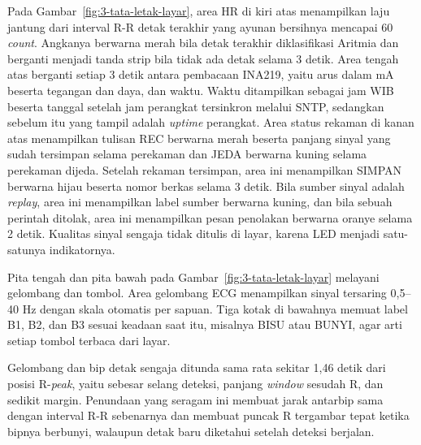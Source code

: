 Pada Gambar~\ref{fig:3-tata-letak-layar}, area HR di kiri atas menampilkan laju jantung dari interval R-R detak terakhir yang ayunan bersihnya mencapai 60 \textit{count}. Angkanya berwarna merah bila detak terakhir diklasifikasi Aritmia dan berganti menjadi tanda strip bila tidak ada detak selama 3 detik. Area tengah atas berganti setiap 3 detik antara pembacaan INA219, yaitu arus dalam mA beserta tegangan dan daya, dan waktu. Waktu ditampilkan sebagai jam WIB beserta tanggal setelah jam perangkat tersinkron melalui SNTP, sedangkan sebelum itu yang tampil adalah \textit{uptime} perangkat. Area status rekaman di kanan atas menampilkan tulisan REC berwarna merah beserta panjang sinyal yang sudah tersimpan selama perekaman dan JEDA berwarna kuning selama perekaman dijeda. Setelah rekaman tersimpan, area ini menampilkan SIMPAN berwarna hijau beserta nomor berkas selama 3 detik. Bila sumber sinyal adalah \textit{replay}, area ini menampilkan label sumber berwarna kuning, dan bila sebuah perintah ditolak, area ini menampilkan pesan penolakan berwarna oranye selama 2 detik. Kualitas sinyal sengaja tidak ditulis di layar, karena LED menjadi satu-satunya indikatornya.

Pita tengah dan pita bawah pada Gambar~\ref{fig:3-tata-letak-layar} melayani gelombang dan tombol. Area gelombang ECG menampilkan sinyal tersaring 0,5--40 Hz dengan skala otomatis per sapuan. Tiga kotak di bawahnya memuat label B1, B2, dan B3 sesuai keadaan saat itu, misalnya BISU atau BUNYI, agar arti setiap tombol terbaca dari layar.

Gelombang dan bip detak sengaja ditunda sama rata sekitar 1,46 detik dari posisi R-\textit{peak}, yaitu sebesar selang deteksi, panjang \textit{window} sesudah R, dan sedikit margin. Penundaan yang seragam ini membuat jarak antarbip sama dengan interval R-R sebenarnya dan membuat puncak R tergambar tepat ketika bipnya berbunyi, walaupun detak baru diketahui setelah deteksi berjalan.

